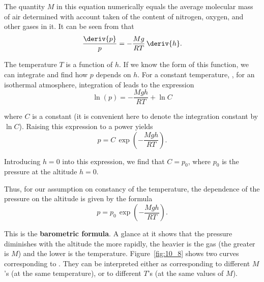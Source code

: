 \noindent
The quantity $M$ in this equation numerically equals the average molecular mass of air determined with account taken of the content of nitrogen, oxygen, and other gases in it. It can be seen from  that
\begin{equation}\label{eq:10_70}
	\frac{\deriv{p}}{p} = -\frac{Mg}{RT}\,\deriv{h}.
\end{equation}

\noindent
The temperature $T$ is a function of $h$. If we know the form of this function, we can integrate  and find how $p$ depends on $h$. For a constant temperature, \ie, for an isothermal atmosphere, integration of  leads to the expression
\begin{equation*}
	\ln({p}) = -\frac{Mgh}{RT} + \ln{C}
\end{equation*}

\noindent
where $C$ is a constant (it is convenient here to denote the integration constant by $\ln{C}$). Raising this expression to a power yields
\begin{equation*}
	p = C\,\exp\left(- \frac{Mgh}{RT} \right).
\end{equation*}

\noindent
Introducing $h=0$ into this expression, we find that $C=p_0$, where $p_0$ is the pressure at the altitude $h=0$.

Thus, for our assumption on constancy of the temperature, the dependence of the pressure on the altitude is given by the formula
\begin{equation}\label{eq:10_71}
	p = p_0\,\exp\left(- \frac{Mgh}{RT} \right).
\end{equation}

\noindent
This is the \textbf{barometric formula}. A glance at it shows that the pressure diminishes with the altitude the more rapidly, the heavier is the gas (the greater is $M$) and the lower is the temperature. Figure~\ref{fig:10_8} shows two curves corresponding to . They can be interpreted either as corresponding to different $M$'s (at the same temperature), or to different $T$'s (at the same values of $M$).
